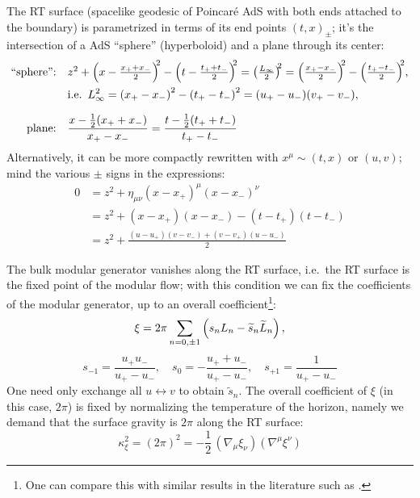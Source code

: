\documentclass[11pt,a4paper,utf8]{article}
\renewcommand{\tilde}[1]{\ensuremath{\widetilde{#1}}}
\begin{document}
	The RT surface (spacelike geodesic of Poincar\'e AdS with both ends attached to the boundary) is parametrized in terms of its end points $(t,x)_\pm$; it's the intersection of a AdS ``sphere'' (hyperboloid) and a plane through its center:
	\begin{equation}
	\begin{aligned}
	\text{``sphere'':} &&&\mathsmaller{
		z^2
		+ \pqty{x - \frac{x_+ + x_-}{2}}^{\!\!2}
		- \pqty{t - \frac{t_+ + t_-}{2}}^{\!\!2}
		= \pqty{\frac{L_\infty}{2}}^{\!\!2}
		= \pqty{\frac{x_+ - x_-}{2}}^{\!\!2}
		- \pqty{\frac{t_+ - t_-}{2}}^{\!\!2}
	},\\
	&&& \text{i.e.}\ \,
		L_\infty^2
		= \pqty{x_+ - x_-}^2
			- \pqty{t_+ - t_-}^2
		= (u_+ - u_-)(v_+ - v_-),
	\\[1.5ex]
	\text{plane:} &&&
		\frac{x - \frac{1}{2} (x_+ + x_-)}{x_+ - x_-}
		= \frac{t - \frac{1}{2} (t_+ + t_-)}{t_+ - t_-}
	\end{aligned}
	\end{equation}
	Alternatively, it can be more compactly rewritten with $x^\mu \sim (t,x)$ or $(u,v)$; mind the various $\pm$ signs in the expressions: 
	\begin{equation}
	\begin{aligned}
		0 &= z^2
			+ \eta_{\mu\nu} (x - x_+)^\mu (x - x_-)^\nu \\
		& = z^2
			+ (x - x_+)(x - x_-)
			- (t - t_+)(t - t_-) \\
		&= z^2 + \frac{
				(u - u_+)(v - v_-)
				+ (v - v_+)(u - u_-)
			}{2}
	\end{aligned}
	\end{equation}
	
	The bulk modular generator vanishes along the RT surface, i.e.~the RT surface is the fixed point of the modular flow; with this condition we can fix the coefficients of the modular generator, up to an overall coefficient\footnote{
		One can compare this with similar results in the literature such as \cite{Lashkari:2016idm,Czech:2019vih,Apolo:2020qjm}. 
	}:
	\begin{equation}
		\xi = 2\pi \sum_{n=0,\pm 1} \pqty{
				s_n L_n - \tilde{s}_n \tilde{L}_n
			},
	\end{equation}
	\begin{equation}
		s_{-1} = \frac{u_+ u_-}{u_+ - u_-},\quad
		s_0 = - \frac{u_+ + u_-}{u_+ - u_-},\quad
		s_{+1} = \frac{1}{u_+ - u_-}
	\end{equation}
	One need only exchange all $u\leftrightarrow v$ to obtain $\tilde{s}_n$. The overall coefficient of $\xi$ (in this case, $2\pi$) is fixed by normalizing the temperature of the horizon, namely we demand that the surface gravity is $2\pi$ along the RT surface:
	\begin{equation}
		\kappa_\xi^2
		= (2\pi)^2
		= -\frac{1}{2}\,
			(\nabla_{\mu} \xi_{\nu})
			(\nabla^{\mu} \xi^{\nu})
	\end{equation}
	
\end{document}
